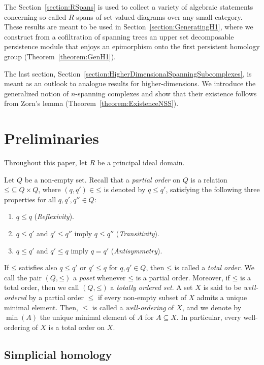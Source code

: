 \documentclass[oneside]{amsart}
\theoremstyle{definition}
\begin{document}
The Section~\ref{section:RSpans} is used to collect a variety of algebraic statements concerning so-called $R$-spans of set-valued diagrams over any small category.
These results are meant to be used in Section~\ref{section:GeneratingH1}, where we construct from a cofiltration of spanning trees an upper set decomposable persistence module that enjoys an epimorphism onto the first persistent homology group (Theorem~\ref{theorem:GenH1}).

The last section, Section~\ref{section:HigherDimensionalSpanningSubcomplexes}, is meant as an outlook to analogue results for higher-dimensions.
We introduce the generalized notion of $n$-spanning complexes and show that their existence follows from Zorn's lemma (Theorem~\ref{theorem:ExistenceNSS}).

\section{Preliminaries}%
\label{section:Preliminaries}

Throughout this paper, let $R$ be a principal ideal domain.

Let $Q$ be a non-empty set.
Recall that a \emph{partial order} on $Q$ is a relation $\mathord\leq \subseteq Q \times Q$, where $(q, q') \in \mathord\leq$ is denoted by $q \leq q'$, satisfying the following three properties for all $q, q', q'' \in Q$:
\begin{enumerate}[label=(\roman*)]
    \item $q \leq q$ (\emph{Reflexivity}).
    \item $q \leq q'$ and $q' \leq q''$ imply $q \leq q''$ (\emph{Transitivity}).
    \item $q \leq q'$ and $q' \leq q$ imply $q = q'$ (\emph{Antisymmetry}).
\end{enumerate}
If $\mathord\leq$ satisfies also $q \leq q'$ or $q' \leq q$ for $q, q' \in Q$, then $\mathord\leq$ is called a \emph{total order}.
We call the pair $(Q, \mathord\leq)$ a \emph{poset} whenever $\mathord\leq$ is a partial order.
Moreover, if $\mathord\leq$ is a total order, then we call $(Q, \mathord\leq)$ a \emph{totally ordered set}.
A set $X$ is said to be \emph{well-ordered} by a partial order $\leq$ if every non-empty subset of $X$ admits a unique minimal element.
Then, $\leq$ is called a \emph{well-ordering} of $X$, and we denote by $\min(A)$ the unique minimal element of $A$ for $A \subseteq X$.
In particular, every well-ordering of $X$ is a total order on $X$.

\subsection{Simplicial homology}
\end{document}
